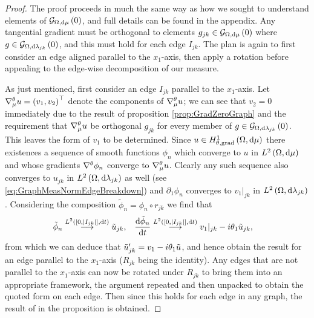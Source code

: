 \begin{proof}
	The proof proceeds in much the same way as how we sought to understand elements of $\mathcal{G}_{ \Omega, \mathrm{d}\mu}\left( 0 \right)$, and full details can be found in the appendix.
	Any tangential gradient must be orthogonal to elements $g_{jk}\in\mathcal{G}_{ \Omega, \mathrm{d}\mu}\left( 0 \right)$ where $g\in\mathcal{G}_{ \Omega, \mathrm{d}\lambda_{jk}}\left( 0 \right)$, and this must hold for each edge $I_{jk}$.
	The plan is again to first consider an edge aligned parallel to the $x_1$-axis, then apply a rotation before appealing to the edge-wise decomposition of our measure. \newline
	
	As just mentioned, first consider an edge $I_{jk}$ parallel to the $x_1$-axis. 
	Let $\nabla^{\theta}_\mu u = \left( v_1, v_2 \right)^\top$ denote the components of $\nabla^{\theta}_\mu u$; we can see that $v_2=0$ immediately due to the result of proposition \ref{prop:GradZeroGraph} and the requirement that $\nabla^{\theta}_\mu u$ be orthogonal $g_{jk}$ for every member of $g\in\mathcal{G}_{ \Omega, \mathrm{d}\lambda_{jk}}\left( 0 \right)$.
	This leaves the form of $v_1$ to be determined.
	Since $u\in H^1_{\theta, \mathrm{grad}}\left( \Omega, \mathrm{d}\mu \right)$ there existences a sequence of smooth functions $\phi_n$ which converge to $u$ in $L^{2}\left( \Omega,\mathrm{d}\mu \right)$ and whose gradients $\nabla^{\theta}\phi_n$ converge to $\nabla^{\theta}_\mu u$.
	Clearly any such sequence also converges to $u_{jk}$ in $L^{2}\left( \Omega,\mathrm{d}\lambda_{jk} \right)$ as well (see \eqref{eq:GraphMeasNormEdgeBreakdown}) and $\partial_1\phi_n$ converges to $v_1\vert_{jk}$ in $L^{2}\left( \Omega,\mathrm{d}\lambda_{jk} \right)$.
	Considering the composition $\tilde{\phi}_n = \phi_n \circ r_{jk}$ we find that
	\begin{align*}
		\tilde{\phi}_n \overset{L^{2}\left( \left[ 0,\left\lvert I_{jk} \right\rvert \right],\mathrm{d}t \right)}{\longrightarrow} \tilde{u}_{jk},
		&\quad \dfrac{\mathrm{d}\tilde{\phi}_n}{\mathrm{d}t} \overset{L^{2}\left( \left[ 0,\left\lvert I_{jk} \right\rvert \right],\mathrm{d}t \right)}{\longrightarrow} v_1\vert_{jk} - i\theta_1 \tilde{u}_{jk},
	\end{align*}
	from which we can deduce that $\tilde{u}_{jk}' = v_1 - i\theta_1\tilde{u}$, and hence obtain the result for an edge parallel to the $x_1$-axis ($R_{jk}$ being the identity).
	Any edges that are not parallel to the $x_1$-axis can now be rotated under $R_{jk}$ to bring them into an appropriate framework, the argument repeated and then unpacked to obtain the quoted form on each edge.
	Then since this holds for each edge in any graph, the result of in the proposition is obtained.
\end{proof}

